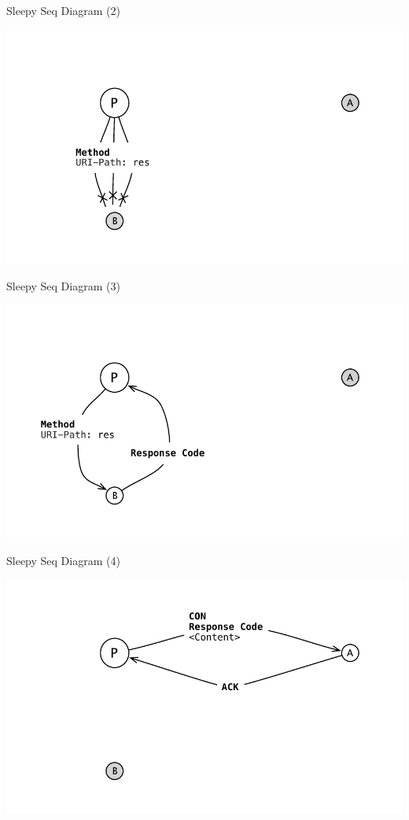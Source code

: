 \documentclass{beamer}
\begin{document}
\begin{frame}{Sleepy Seq Diagram (2)}
 \begin{center}
  \includegraphics[width=\textwidth]{../../share/images/sleepy2.pdf}
 \end{center}
\end{frame}

\begin{frame}{Sleepy Seq Diagram (3)}
 \begin{center}
  \includegraphics[width=\textwidth]{../../share/images/sleepy3.pdf}
 \end{center}
\end{frame}

\begin{frame}{Sleepy Seq Diagram (4)}
 \begin{center}
  \includegraphics[width=\textwidth]{../../share/images/sleepy4.pdf}
 \end{center}
\end{frame}
\end{document}
